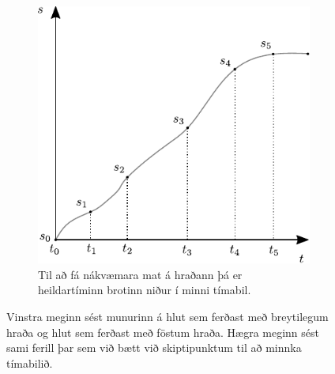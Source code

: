 \begin{figure}[H]
\begin{subfigure}[h]{.4\textwidth}
    \includegraphics[width=\linewidth]{figures/stodutimagraf-skiptingar.pdf}
    \caption{Til að fá nákvæmara mat á hraðann þá er heildartíminn brotinn niður í minni tímabil.}
    \label{fig:st-skiptingar}
\end{subfigure}
\caption{Vinstra meginn sést munurinn á hlut sem ferðast með breytilegum hraða og hlut sem ferðast með föstum hraða. Hægra meginn sést sami ferill þar sem við bætt við skiptipunktum til að minnka tímabilið.}
\end{figure}

